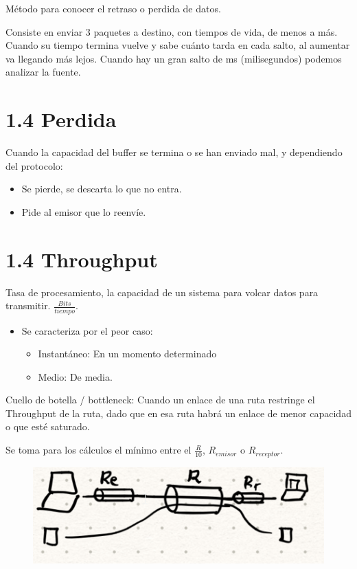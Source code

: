 \documentclass[12pt, twoside, openright]{report} %
\begin{document}
Método para conocer el retraso o perdida de datos.

Consiste en enviar 3 paquetes a destino, con tiempos de vida, de menos
a más. Cuando su tiempo termina vuelve y sabe cuánto tarda en cada
salto, al aumentar va llegando más lejos. Cuando hay un gran salto de
ms (milisegundos) podemos analizar la fuente.

\section{1.4 Perdida}

Cuando la capacidad del buffer se termina o se han enviado mal, y
dependiendo del protocolo:

\begin{itemize}
	\item Se pierde, se descarta lo que no entra.
	\item Pide al emisor que lo reenvíe.
\end{itemize}

\section{1.4 Throughput}


Tasa de procesamiento, la capacidad de un sistema para volcar datos
para transmitir. \(\frac{Bits}{tiempo}\).

\begin{itemize}
	\item Se caracteriza por el peor caso:

	      \begin{itemize}
		      \item Instantáneo: En un momento determinado
		      \item Medio: De media.
	      \end{itemize}
\end{itemize}

Cuello de botella / bottleneck: Cuando un enlace de una ruta restringe
el Throughput de la ruta, dado que en esa ruta habrá un enlace de
menor capacidad o que esté saturado.

Se toma para los cálculos el mínimo entre el \(\frac{R}{10}\),
\(R_{emisor}\) o \(R_{receptor}\).
\begin{figure}[H]
	{\includegraphics[scale=.5]{Untitled 2.png}}
\end{figure}
\end{document}
